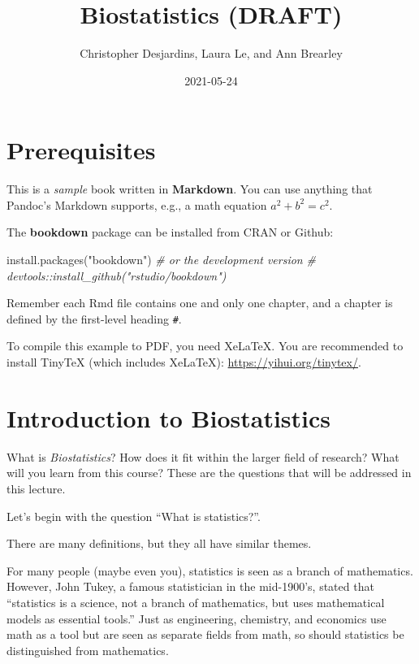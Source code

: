 \documentclass[
]{book}
\title{Biostatistics (DRAFT)}
\author{Christopher Desjardins, Laura Le, and Ann Brearley}
\date{2021-05-24}
\newenvironment{Shaded}{\begin{snugshade}}{\end{snugshade}}
\newcommand{\CommentTok}[1]{\textcolor[rgb]{0.56,0.35,0.01}{\textit{#1}}}
\newcommand{\FunctionTok}[1]{\textcolor[rgb]{0.00,0.00,0.00}{#1}}
\newcommand{\NormalTok}[1]{#1}
\newcommand{\StringTok}[1]{\textcolor[rgb]{0.31,0.60,0.02}{#1}}
\begin{document}
\maketitle

{
\setcounter{tocdepth}{1}
\tableofcontents
}
\hypertarget{prerequisites}{%
\chapter{Prerequisites}\label{prerequisites}}

This is a \emph{sample} book written in \textbf{Markdown}. You can use anything that Pandoc's Markdown supports, e.g., a math equation \(a^2 + b^2 = c^2\).

The \textbf{bookdown} package can be installed from CRAN or Github:

\begin{Shaded}
\begin{Highlighting}[]
\FunctionTok{install.packages}\NormalTok{(}\StringTok{"bookdown"}\NormalTok{)}
\CommentTok{\# or the development version}
\CommentTok{\# devtools::install\_github("rstudio/bookdown")}
\end{Highlighting}
\end{Shaded}

Remember each Rmd file contains one and only one chapter, and a chapter is defined by the first-level heading \texttt{\#}.

To compile this example to PDF, you need XeLaTeX. You are recommended to install TinyTeX (which includes XeLaTeX): \url{https://yihui.org/tinytex/}.

\hypertarget{introduction-to-biostatistics}{%
\chapter{Introduction to Biostatistics}\label{introduction-to-biostatistics}}

What is \emph{Biostatistics}? How does it fit within the larger field of research? What will you learn from this course? These are the questions that will be addressed in this lecture.

Let's begin with the question ``What is statistics?''.

There are many definitions, but they all have similar themes.

For many people (maybe even you), statistics is seen as a branch of mathematics. However, John Tukey, a famous statistician in the mid-1900's, stated that ``statistics is a science, not a branch of mathematics, but uses mathematical models as essential tools.'' Just as engineering, chemistry, and economics use math as a tool but are seen as separate fields from math, so should statistics be distinguished from mathematics.
\end{document}
